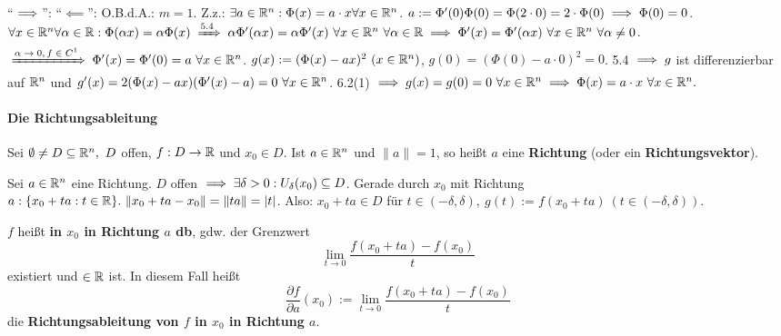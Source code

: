 \documentclass[a4paper,oneside,DIV15,BCOR12mm,chapterprefix=true,headings=onelinechapter]{scrbook}
\begin{document}
\begin{beweis}
``$\implies$'':
``$\impliedby$'': O.B.d.A.: $m=1$. Z.z.: $\exists a \in \mathbb{R}^n:\Phi(x)=a\cdot x \forall x \in \mathbb{R}^n$.
$a:=\Phi'(0) \Phi(0)=\Phi(2\cdot0)=2\cdot \Phi(0) \implies \Phi(0)=0$.
$\forall x \in \MdR^n \forall \alpha \in \MdR: \Phi(\alpha x)=\alpha\Phi(x) \folgtnach{5.4} \alpha \Phi'(\alpha x)=\alpha\Phi'(x)\ \forall x \in \MdR^n\ \forall \alpha \in \MdR
\folgt \Phi'(x)=\Phi'(\alpha x)\ \forall x \in\MdR^n\ \forall\alpha\ne0$.$ \folgtnach{$\alpha\to0, f\in C^1$} \Phi'(x)=\Phi'(0)=a\ \forall x \in\MdR^n$.
$g(x):=(\Phi(x)-ax)^2\ (x \in \mathbb{R}^n)$, $ g(0)=(\Phi(0)-a\cdot0)^2=0$.
5.4 $\implies g$ ist differenzierbar auf $\mathbb{R}^n$ und $g'(x)=2(\Phi(x)-ax)(\Phi'(x)-a)=0\ \forall x \in \mathbb{R}^n$.
6.2(1) $\folgt g(x)=g(0)=0\ \forall x\in\MdR^n \folgt \Phi(x)=a\cdot x\ \forall x \in \MdR^n.$
\end{beweis}

\paragraph{Die Richtungsableitung}
Sei $\emptyset \ne D \subseteq \MdR^n,\ D$ offen, $f:D \to \mathbb{R}$ und $x_0 \in D$. Ist $a \in \mathbb{R}^n$ und $\|a\|=1$, so heißt $a$ eine \textbf{Richtung} (oder ein \textbf{Richtungsvektor}).

Sei $a \in \mathbb{R}^n$ eine Richtung. $D$ offen $\implies \exists \delta>0: U_\delta(x_0) \subseteq D$. Gerade durch $x_0$ mit Richtung $a:\{x_0+ta:t\in\mathbb{R}\}.\  \|x_0+ta-x_0\| = \|ta\| = |t|$. Also: $x_0+ta \in D$ für $t \in (-\delta,\delta),\ g(t) := f(x_0+ta)\ (t \in (-\delta,\delta))$.

$f$ heißt \textbf{in $x_0$ in Richtung $a$ db}, gdw. der Grenzwert $$\lim_{t\to 0} \frac{f(x_0+ta)-f(x_0)}{t}$$ existiert und $\in \mathbb{R}$ ist. In diesem Fall heißt $$\frac{\partial f}{\partial a}(x_0) := \lim_{t\to 0} \frac{f(x_0+ta)-f(x_0)}{t}$$ die \textbf{Richtungsableitung von $f$ in $x_0$ in Richtung $a$}.
\end{document}
